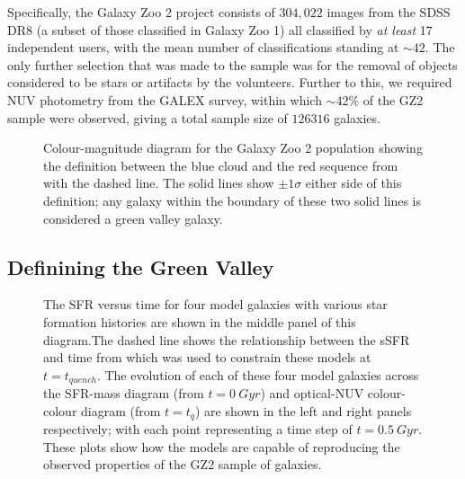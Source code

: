 \documentclass{mn2e}
\begin{document}
Specifically, the Galaxy Zoo 2 project consists of $304, 022$ images from the SDSS DR8 (a subset of those classified in Galaxy Zoo 1) all classified by \emph{at least} 17 independent users, with the mean number of classifications standing at $\sim42$. The only further selection that was made to the sample was for the removal of  objects considered to be stars or artifacts by the volunteers. Further to this, we required NUV photometry from the GALEX survey, within which $\sim42\%$ of the GZ2 sample were observed, giving a total sample size of $126316$ galaxies. 

\begin{figure}
\caption{Colour-magnitude diagram for the Galaxy Zoo 2 population showing the definition between the blue cloud and the red sequence from \citet{Baldry} with the dashed line. The solid lines show $\pm 1\sigma$ either side of this definition; any galaxy within the boundary of these two solid lines is considered a green valley galaxy.}
\label{CMGV}
\end{figure}

\subsection{Definining the Green Valley}\label{defGV}
\begin{figure}
\caption{The SFR versus time for four model galaxies with various star formation histories are shown in the middle panel of this diagram.The dashed line shows the relationship between the sSFR and time from \citet{Peng} which was used to constrain these models at $t=t_{quench}$. The evolution of each of these four model galaxies across the SFR-mass diagram (from $t=0~Gyr$) and optical-NUV colour-colour diagram (from $t=t_q$) are shown in the left and right panels respectively; with each point representing a time step of $t=0.5~Gyr$. These plots show how the models are capable of reproducing the observed properties of the GZ2 sample of galaxies.}
\label{sfr_mass_col}
\end{figure}
\end{document}
